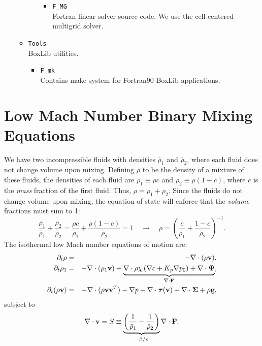 \documentclass[final]{siamltex}
\def\Fb {{\bf F}}
\def\gb {{\bf g}}
\def\vb {{\bf v}}
\def\Psib   {\boldsymbol{\Psi}}
\def\Sigmab {\boldsymbol{\Sigma}}
\def\taub   {\boldsymbol{\tau}}
\begin{document}
\begin{itemize}
\begin{itemize}
\begin{itemize}
\begin{itemize}
\item {\tt F\_MG}\\
Fortran linear solver source code.  We use the cell-centered multigrid solver.
\end{itemize}
\end{itemize}
\item {\tt Tools}\\
BoxLib utilities.
\begin{itemize}
\item {\tt F\_mk}\\
Contains make system for Fortran90 BoxLib applications.
\end{itemize}
\end{itemize}
\end{itemize}

\section{Low Mach Number Binary Mixing Equations}
We have two incompressible fluids with densities $\bar\rho_1$ and $\bar\rho_2$, where 
each fluid does not change volume upon mixing.  Defining $\rho$ to be the density of
a mixture of these fluids, the densities of each fluid are $\rho_1 \equiv \rho c$ and 
$\rho_2 \equiv \rho(1-c)$, where $c$ is the {\it mass} fraction of the first fluid.  
Thus, $\rho = \rho_1 + \rho_2$.  Since the fluids do not change volume upon mixing, 
the equation of state will enforce that the {\it volume} fractions must sum to 1:
\begin{equation}
\frac{\rho_1}{\bar\rho_1} + \frac{\rho_2}{\bar\rho_2} =
\frac{\rho c}{\bar\rho_1} + \frac{\rho(1-c)}{\bar\rho_2} = 1 
\quad \rightarrow \quad
\rho = \left(\frac{c}{\bar\rho_1} + \frac{1-c}{\bar\rho_2}\right)^{-1}.
\end{equation}
The isothermal low Mach number equations of motion are:
\begin{eqnarray}
\partial_t\rho &=& -\nabla\cdot(\rho\vb),\\
\partial_t\rho_1 &=& -\nabla\cdot(\rho_1\vb) + \underbrace{\nabla\cdot\rho\chi\left(\nabla c + K_p\nabla p_0\right) + \nabla\cdot\Psib}_{\nabla\cdot\Fb},\\
\partial_t(\rho\vb) &=& -\nabla\cdot(\rho\vb\vb^T) - \nabla p + \nabla\cdot\taub(\vb) + \nabla\cdot\Sigmab + \rho\gb,
\end{eqnarray}
subject to
\begin{equation}
\nabla\cdot\vb = S \equiv \underbrace{\left(\frac{1}{\bar\rho_1}-\frac{1}{\bar\rho_2}\right)}_{-\beta/\rho}\nabla\cdot\Fb.
\end{equation}
\end{document}
